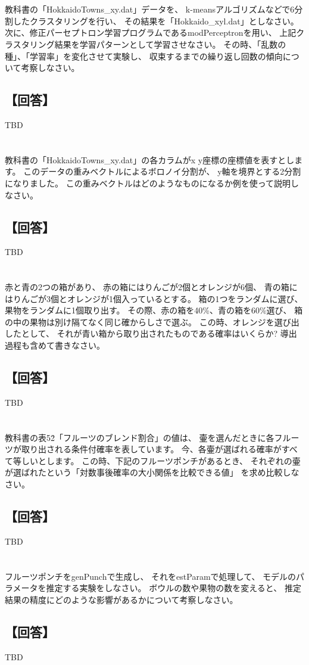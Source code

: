 \documentclass[a4j]{jarticle}
\begin{document}
\section{}
教科書の「HokkaidoTowns\_xy\@.dat」データを、
k-meansアルゴリズムなどで6分割したクラスタリングを行い、
その結果を「Hokkaido\_xyl\@.dat」としなさい。
次に、修正パーセプトロン学習プログラムであるmodPerceptronを用い、
上記クラスタリング結果を学習パターンとして学習させなさい。
その時、「乱数の種」、「学習率」を変化させて実験し、
収束するまでの繰り返し回数の傾向について考察しなさい。

\subsection{【回答】}
TBD

\section{}
教科書の「HokkaidoTowns\_xy\@.dat」の各カラムがx y座標の座標値を表すとします。
このデータの重みベクトルによるボロノイ分割が、
y軸を境界とする2分割になりました。
この重みベクトルはどのようなものになるか例を使って説明しなさい。

\subsection{【回答】}
TBD

\section{}
赤と青の2つの箱があり、
赤の箱にはりんごが2個とオレンジが6個、
青の箱にはりんごが3個とオレンジが1個入っているとする。
箱の1つをランダムに選び、果物をランダムに1個取り出す。
その際、赤の箱を40\%、青の箱を60\%選び、
箱の中の果物は別け隔てなく同じ確からしさで選ぶ。
この時、オレンジを選び出したとして、
それが青い箱から取り出されたものである確率はいくらか?
導出過程も含めて書きなさい。

\subsection{【回答】}
TBD

\section{}
教科書の表5\.2「フルーツのブレンド割合」の値は、
壷を選んだときに各フルーツが取り出される条件付確率を表しています。
今、各壷が選ばれる確率がすべて等しいとします。
この時、下記のフルーツポンチがあるとき、
それぞれの壷が選ばれたという「対数事後確率の大小関係を比較できる値」
を求め比較しなさい。

\subsection{【回答】}
TBD

\section{}
フルーツポンチをgenPunchで生成し、
それをestParamで処理して、
モデルのパラメータを推定する実験をしなさい。
ボウルの数や果物の数を変えると、
推定結果の精度にどのような影響があるかについて考察しなさい。

\subsection{【回答】}
TBD
\end{document}
